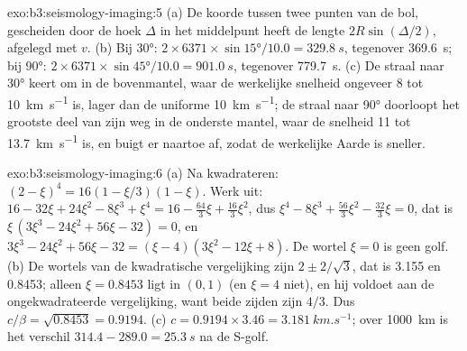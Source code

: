 \begin{solution}{exo:b3:seismology-imaging:5}
(a) De koorde tussen twee punten van de bol, gescheiden door de hoek $\Delta$
in het middelpunt heeft de lengte $2R\sin(\Delta/2)$, afgelegd met $v$.
(b) Bij \ang{30}: $2\times6371\times\sin\ang{15}/10.0 = \qty{329.8}{s}$, tegenover
\qty{369.6}{s}; bij \ang{90}: $2\times6371\times\sin\ang{45}/10.0 =
\qty{901.0}{s}$, tegenover \qty{779.7}{s}. (c) De straal naar \ang{30} keert om in de
bovenmantel, waar de werkelijke snelheid ongeveer 8 tot \qty{10}{km.s^{-1}} is, lager dan de
uniforme \qty{10}{km.s^{-1}}; de straal naar \ang{90} doorloopt het grootste deel van zijn weg in de
onderste mantel, waar de snelheid 11 tot \qty{13.7}{km.s^{-1}} is, en buigt er naartoe af, zodat de
werkelijke Aarde is sneller.
\end{solution}

\begin{solution}{exo:b3:seismology-imaging:6}
(a) Na kwadrateren: $(2 - \xi)^4 = 16(1 - \xi/3)(1 - \xi)$. Werk uit:
$16 - 32\xi + 24\xi^2 - 8\xi^3 + \xi^4 = 16 - \tfrac{64}{3}\xi + \tfrac{16}{3}\xi^2$,
dus $\xi^4 - 8\xi^3 + \tfrac{56}{3}\xi^2 - \tfrac{32}{3}\xi = 0$, dat is
$\xi\,(3\xi^3 - 24\xi^2 + 56\xi - 32) = 0$, en
$3\xi^3 - 24\xi^2 + 56\xi - 32 = (\xi - 4)(3\xi^2 - 12\xi + 8)$. De wortel
$\xi = 0$ is geen golf. (b) De wortels van de kwadratische vergelijking zijn $2 \pm 2/\sqrt3$,
dat is 3.155 en 0.8453; alleen $\xi = 0.8453$ ligt in $(0, 1)$ (en $\xi = 4$
niet), en hij voldoet aan de ongekwadrateerde vergelijking, want beide zijden zijn $4/3$.
Dus $c/\beta = \sqrt{0.8453} = 0.9194$. (c) $c = 0.9194\times3.46 =
\qty{3.181}{km.s^{-1}}$; over \qty{1000}{km} is het verschil $314.4 - 289.0 = \qty{25.3}{s}$
na de S-golf.
\end{solution}

